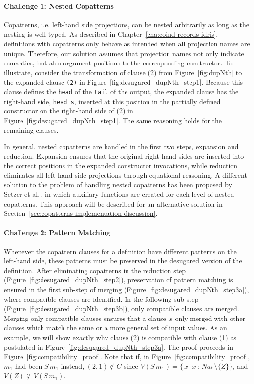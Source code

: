 \paragraph{Challenge 1: Nested Copatterns}
Copatterns, i.e. left-hand side projections, can be nested arbitrarily as long
as the nesting is well-typed. As described in
Chapter~\ref{cha:coind-records-idris}, definitions with copatterns only behave
as intended when all projection names are unique. Therefore, our solution
assumes that projection names not only indicate semantics, but also argument
positions to the corresponding constructor. To illustrate, consider the
transformation of clause (2) from Figure~\ref{fig:dupNth} to the expanded clause
\texttt{(2)} in Figure~\ref{fig:desugared_dupNth_step1}. Because this clause
defines the \texttt{head} of the \texttt{tail} of the output, the expanded
clause has the right-hand side, \texttt{head~s}, inserted at this position in
the partially defined constructor on the right-hand side of (2) in
Figure~\ref{fig:desugared_dupNth_step1}. The same reasoning holds for the remaining clauses.

In general, nested copatterns are handled in the first two steps, expansion and
reduction. Expansion ensures that the original right-hand sides are inserted
into the correct positions in the expanded constructor invocations, while
reduction eliminates all left-hand side projections through equational
reasoning. A different solution to the problem of handling nested copatterns has
been proposed by Setzer et al.\,\citep{Setzer14Unnesting}, in which auxiliary
functions are created for each level of nested copatterns. This approach will be
described for an alternative solution in Section~\ref{sec:copatterns-implementation-discussion}.

\paragraph{Challenge 2: Pattern Matching}
Whenever the copattern clauses for a definition have different patterns on the
left-hand side, these patterns must be preserved in the desugared version of the
definition. After eliminating copatterns in the reduction step
(Figure~\ref{fig:desugared_dupNth_step2}), preservation of pattern matching is
ensured in the first sub-step of merging
(Figure~\ref{fig:desugared_dupNth_step3a}), where compatible clauses are
identified. In the following sub-step (Figure~\ref{fig:desugared_dupNth_step3b}), only compatible clauses are
merged. Merging only compatible clauses ensures that a clause is only merged
with other clauses which match the same or a more general set of input values. As an example, we will show exactly why clause (2) is compatible
with clause (1) as postulated in
Figure~\ref{fig:desugared_dupNth_step3a}. The proof
proceeds in Figure~\ref{fig:compatibility_proof}. Note that if, in Figure~\ref{fig:compatibility_proof}, $m_{1}$ had been
$S\,m_{1}$ instead, $(2,1)\notin C$ since $V(S\,m_{1}) =
\{\,x\,|\,x\,:\,Nat\,\setminus\{Z\}\}$, and $V(Z)\not\subseteq V(S\,m_{1})$.

